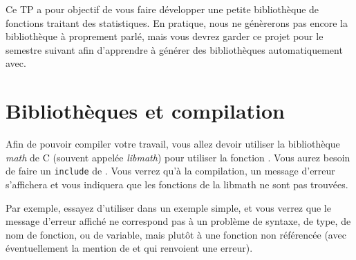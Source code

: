 \documentclass[11pt,a4paper]{article}
\begin{document}
\EncadreTitre

\bigskip


%
%

\bigskip


Ce TP a pour objectif de vous faire développer une petite bibliothèque de fonctions traitant des statistiques.
En pratique, nous ne génèrerons pas encore la bibliothèque à proprement parlé, mais vous devrez garder ce projet pour le semestre suivant afin d'apprendre à générer des bibliothèques automatiquement avec.


\bigskip

\section{Bibliothèques et compilation}

\bigskip

Afin de pouvoir compiler votre travail, vous allez devoir utiliser la bibliothèque \textit{math} de C (souvent appelée \textit{libmath}) pour utiliser la fonction .
Vous aurez besoin de faire un \texttt{include} de .
Vous verrez qu'à la compilation, un message d'erreur s'affichera et vous indiquera que les fonctions de la libmath ne sont pas trouvées.

\medskip

Par exemple, essayez d'utiliser  dans un exemple simple, et vous verrez que le message d'erreur affiché ne correspond pas à un problème de syntaxe, de type, de nom de fonction, ou de variable, mais plutôt à une fonction non référencée (avec éventuellement la mention de  et  qui renvoient une erreur).
\end{document}
